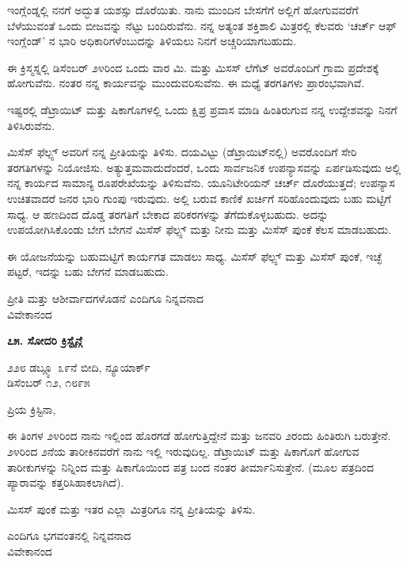 ಇಂಗ್ಲೆಂಡ್ನಲ್ಲಿ ನನಗೆ ಅದ್ಭುತ ಯಶಸ್ಸು ದೊರೆಯಿತು. ನಾನು ಮುಂದಿನ ಬೇಸಗೆಗೆ ಅಲ್ಲಿಗೆ ಹೋಗುವವರೆಗೆ ಬೆಳೆಯುವಂತೆ ಒಂದು ಬೀಜವನ್ನು ನೆಟ್ಟು ಬಂದಿರುವೆನು. ನನ್ನ ಅತ್ಯಂತ ಶಕ್ತಿಶಾಲಿ ಮಿತ್ರರಲ್ಲಿ ಕೆಲವರು ‘ಚರ್ಚ್ ಆಫ್ ಇಂಗ್ಲೆಂಡ್’ ನ ಭಾರಿ ಅಧಿಕಾರಿಗಳೆಂಬುದನ್ನು ತಿಳಿಯಲು ನಿನಗೆ ಅಚ್ಚರಿಯಾಗಬಹುದು.

ಈ ಕ್ರಿಸ್ಮಸ್ನಲ್ಲಿ ಡಿಸೆಂಬರ್ ೨೪ರಿಂದ ಒಂದು ವಾರ ಮಿ. ಮತ್ತು ಮಿಸಸ್ ಲೆಗೆಟ್ ಅವರೊಂದಿಗೆ ಗ್ರಾಮ ಪ್ರದೇಶಕ್ಕೆ ಹೋಗುವೆನು. ನಂತರ ನನ್ನ ಕಾರ್ಯವನ್ನು ಮುಂದುವರಿಸುವೆನು. ಈ ಮಧ್ಯೆ ತರಗತಿಗಳು ಪ್ರಾರಂಭವಾಗಿವೆ.

ಇಷ್ಟರಲ್ಲಿ ಡೆಟ್ರಾಯಿಟ್ ಮತ್ತು ಷಿಕಾಗೊಗಳಲ್ಲಿ ಒಂದು ಕ್ಷಿಪ್ರ ಪ್ರವಾಸ ಮಾಡಿ ಹಿಂತಿರುಗುವ ನನ್ನ ಉದ್ದೇಶವನ್ನು ನಿನಗೆ ತಿಳಿಸಿರುವೆನು.

ಮಿಸೆಸ್ ಫೆಲ್ಪ್ಸ್ ಅವರಿಗೆ ನನ್ನ ಪ್ರೀತಿಯನ್ನು ತಿಳಿಸು. ದಯವಿಟ್ಟು (ಡೆಟ್ರಾಯಿಟ್‌ನಲ್ಲಿ) ಅವರೊಂದಿಗೆ ಸೇರಿ ತರಗತಿಗಳನ್ನು ನಿಯೋಜಿಸು. ಅತ್ಯುತ್ತಮವಾದುದೆಂದರೆ, ಒಂದು ಸಾರ್ವಜನಿಕ ಉಪನ್ಯಾಸವನ್ನು ಏರ್ಪಡಿಸುವುದು ಅಲ್ಲಿ ನನ್ನ ಕಾರ್ಯದ ಸಾಮಾನ್ಯ ರೂಪರೇಖೆಯನ್ನು ತಿಳಿಸುವೆನು. ಯೂನಿಟೇರಿಯನ್ ಚರ್ಚ್ ದೊರೆಯುತ್ತದೆ; ಉಪನ್ಯಾಸ ಉಚಿತವಾದರೆ ಜನರ ಭಾರಿ ಗುಂಪು ಇರುವುದು. ಅಲ್ಲಿ ಬರುವ ಕಾಣಿಕೆ ಖರ್ಚಿಗೆ ಸರಿಹೊಂದುವುದು ಬಹು ಮಟ್ಟಿಗೆ ಸಾಧ್ಯ. ಆ ಹಣದಿಂದ ದೊಡ್ಡ ತರಗತಿಗೆ ಬೇಕಾದ ಪರಿಕರಗಳನ್ನು ತೆಗೆದುಕೊಳ್ಳಬಹುದು. ಅದನ್ನು ಉಪಯೋಗಿಸಿಕೊಂಡು ಬೇಗ ಬೇಗನೆ ಮಿಸೆಸ್ ಫೆಲ್ಪ್ಸ್ ಮತ್ತು ನೀನು ಮತ್ತು ಮಿಸೆಸ್ ಪುಂಕೆ ಕೆಲಸ ಮಾಡಬಹುದು.

ಈ ಯೋಜನೆಯನ್ನು ಬಹುಮಟ್ಟಿಗೆ ಕಾರ್ಯಗತ ಮಾಡಲು ಸಾಧ್ಯ. ಮಿಸೆಸ್ ಫೆಲ್ಪ್ಸ್ ಮತ್ತು ಮಿಸೆಸ್ ಪುಂಕೆ, ಇಚ್ಛೆ ಪಟ್ಟರೆ, ಇದನ್ನು ಬಹು ಬೇಗನೆ ಮಾಡಬಹುದು.

\begin{flushright}
ಪ್ರೀತಿ ಮತ್ತು ಆಶೀರ್ವಾದಗಳೊಡನೆ ಎಂದಿಗೂ ನಿನ್ನವನಾದ\\ವಿವೇಕಾನಂದ
\end{flushright}

\begin{center}
\textbf{೭೫. ಸೋದರಿ ಕ್ರಿಸ್ಟೈನ್ಗೆ}
\end{center}

\begin{flushright}
೨೨೮ ಡಬ್ಲ್ಯೂ ೩೯ನೆ ಬೀದಿ, ನ್ಯೂಯಾರ್ಕ್\\ಡಿಸೆಂಬರ್ ೧೨, ೧೮೯೫
\end{flushright}

ಪ್ರಿಯ ಕ್ರಿಸ್ಟಿನಾ,

ಈ ತಿಂಗಳ ೨೪ರಿಂದ ನಾನು ಇಲ್ಲಿಂದ ಹೊರಗಡೆ ಹೋಗುತ್ತಿದ್ದೇನೆ ಮತ್ತು ಜನವರಿ ೨ರಂದು ಹಿಂತಿರುಗಿ ಬರುತ್ತೇನೆ. ೨೪ರಿಂದ ೨ನೆಯ ತಾರೀಕಿನವರೆಗೆ ನಾನು ಇಲ್ಲಿ ಇರುವುದಿಲ್ಲ. ಡೆಟ್ರಾಯಿಟ್ ಮತ್ತು ಷಿಕಾಗೊಗೆ ಹೋಗುವ ತಾರೀಕುಗಳನ್ನು ನಿನ್ನಿಂದ ಮತ್ತು ಷಿಕಾಗೊಯಿಂದ ಪತ್ರ ಬಂದ ನಂತರ ತೀರ್ಮಾನಿಸುತ್ತೇನೆ. (ಮೂಲ ಪತ್ರದಿಂದ ಪ್ಯಾರಾವನ್ನು ಕತ್ತರಿಸಿಹಾಕಲಾಗಿದೆ).

ಮಿಸಸ್ ಪುಂಕೆ ಮತ್ತು ಇತರ ಎಲ್ಲಾ ಮಿತ್ರರಿಗೂ ನನ್ನ ಪ್ರೀತಿಯನ್ನು ತಿಳಿಸು.

\begin{flushright}
ಎಂದಿಗೂ ಭಗವಂತನಲ್ಲಿ ನಿನ್ನವನಾದ\\ವಿವೇಕಾನಂದ
\end{flushright}

